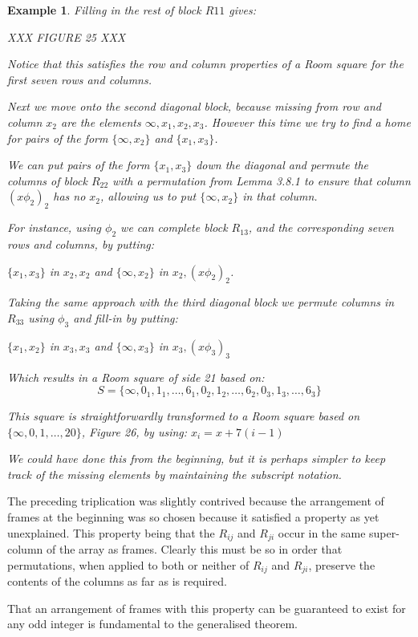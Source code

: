 \documentclass[
  11pt,
  a4paper]{book}
\newtheorem{example}{Example}
\begin{document}
\begin{example}
Filling in the rest of block $R11$ gives:

XXX FIGURE 25 XXX

Notice that this satisfies the row and column properties of
a Room square for the first seven rows and columns.

Next we move onto the second diagonal block, because missing
from row and column $x_2$ are the elements
$\infty, x_1, x_2, x_3$. However this time we try to find
a home for pairs of the form $\{\infty, x_2\}$ and
$\{x_1, x_3\}$.

We can put pairs of the form $\{x_1, x_3\}$ down the diagonal
and permute the columns of block $R_{22}$ with a permutation
from Lemma 3.8.1 to ensure that column $(x\phi _2)_2$ has no
$x_2$, allowing us to put $\{\infty, x_2\}$ in that column.

For instance, using $\phi _2$ we can complete block
$R_{13}$, and the corresponding seven rows and columns, by
putting:

$\{x_1, x_3\}$ in $x_2, x_2$ and $\{\infty, x_2\}$ in
$x_2,(x \phi _2)_2$.

Taking the same approach with the third diagonal block we
permute columns in $R_{33}$ using $\phi _3$ and fill-in by
putting:

$\{x_1, x_2\}$ in $x_3, x_3$ and $\{\infty, x_3\}$ in
$x_3, (x \phi _3)_3$

Which results in a Room square of side 21 based on:
$$S = \{\infty, 0_1, 1_1, \ldots, 6_1, 0_2, 1_2, \ldots, 6_2, 0_3, 1_3, \ldots, 6_3\}$$

This square is straightforwardly transformed to a Room
square based on $\{\infty, 0, 1, \ldots, 20\}$, Figure 26,
by using: $x_i = x + 7(i - 1)$

We could have done this from the beginning, but it is
perhaps simpler to keep track of the missing elements by
maintaining the subscript notation.
\end{example}

The preceding triplication was slightly contrived because
the arrangement of frames at the beginning was so chosen
because it satisfied a property as yet unexplained. This
property being that the \(R_{ij}\) and \(R_{ji}\) occur in the
same super-column of the array as frames. Clearly this must
be so in order that permutations, when applied to both or
neither of \(R_{ij}\) and \(R_{ji}\), preserve the contents of
the columns as far as is required.

That an arrangement of frames with this property can be
guaranteed to exist for any odd integer is fundamental to
the generalised theorem.
\end{document}
